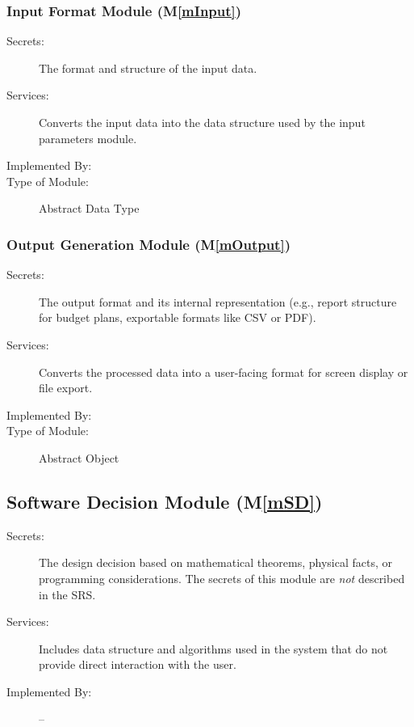 \documentclass[12pt, titlepage]{article}
\newcommand{\mref}[1]{M\ref{#1}}
\begin{document}
\subsubsection{Input Format Module (\mref{mInput})}

\begin{description}
\item[Secrets:]The format and structure of the input data.
\item[Services:]Converts the input data into the data structure used by the
  input parameters module.
\item[Implemented By:] \progname
\item[Type of Module:] Abstract Data Type
\end{description}

\subsubsection{Output Generation Module (\mref{mOutput})}

\begin{description}
\item[Secrets:] The output format and its internal representation (e.g., report structure for budget plans, exportable formats like CSV or PDF).
\item[Services:] Converts the processed data into a user-facing format for screen display or file export.
\item[Implemented By:] \progname
\item[Type of Module:] Abstract Object
\end{description}


\subsection{Software Decision Module (\mref{mSD})}

\begin{description}
\item[Secrets:] The design decision based on mathematical theorems, physical
  facts, or programming considerations. The secrets of this module are
  \emph{not} described in the SRS.
\item[Services:] Includes data structure and algorithms used in the system that
  do not provide direct interaction with the user. 
\item[Implemented By:] --
\end{description}
\end{document}
